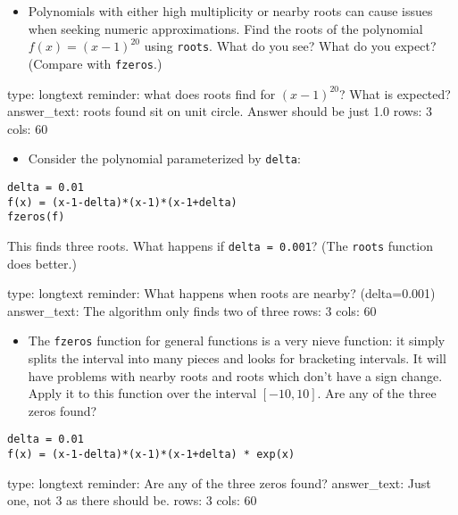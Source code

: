 \documentclass[12pt]{article}
\begin{document}
\begin{itemize}
\itemsep1pt\parskip0pt
\item
  Polynomials with either high multiplicity or nearby roots can cause
  issues when seeking numeric approximations. Find the roots of the
  polynomial $f(x) = (x-1)^{20}$ using \texttt{roots}. What do you see?
  What do you expect? (Compare with \texttt{fzeros}.)
\end{itemize}

\begin{answer}
type: longtext
reminder: what does roots find for \( (x-1)^{20} \)? What is expected?
answer_text: roots found sit on unit circle. Answer should be just 1.0 
rows: 3
cols: 60
\end{answer}

\begin{itemize}
\itemsep1pt\parskip0pt
\item
  Consider the polynomial parameterized by \texttt{delta}:
\end{itemize}



\begin{verbatim}
delta = 0.01
f(x) = (x-1-delta)*(x-1)*(x-1+delta)
fzeros(f)
\end{verbatim}
This finds three roots. What happens if \texttt{delta = 0.001}? (The
\texttt{roots} function does better.)

\begin{answer}
type: longtext
reminder: What happens when roots are nearby? (delta=0.001)
answer_text: The algorithm only finds two of three 
rows: 3
cols: 60
\end{answer}

\begin{itemize}
\itemsep1pt\parskip0pt
\item
  The \texttt{fzeros} function for general functions is a very nieve
  function: it simply splits the interval into many pieces and looks for
  bracketing intervals. It will have problems with nearby roots and
  roots which don't have a sign change. Apply it to this function over
  the interval $[-10,10]$. Are any of the three zeros found?
\end{itemize}



\begin{verbatim}
delta = 0.01
f(x) = (x-1-delta)*(x-1)*(x-1+delta) * exp(x)
\end{verbatim}
\begin{answer}
type: longtext
reminder: Are any of the three zeros found?
answer_text: Just one, not 3 as there should be. 
rows: 3
cols: 60
\end{answer}
\end{document}
